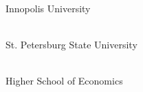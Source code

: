 \cleardoublepage
{}

\newcommand\partner[3]{ \\ #3}

\partner{height=0.7in}{partners/iu}{Innopolis University}

\partner{height=0.7in}{partners/spbu}{St. Petersburg State University}

\partner{height=0.8in}{partners/hse}{Higher School of Economics}

